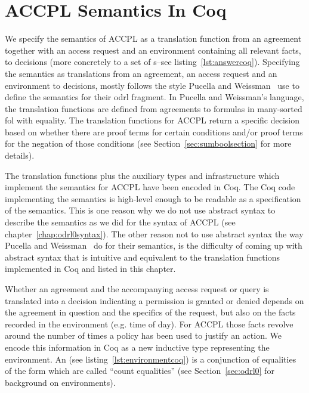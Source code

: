 \chapter{ACCPL Semantics In Coq}\label{chap:accplsemanticscoq}

We specify the semantics of \ac{ACCPL} as a translation function from an agreement together with an access request and an environment containing all relevant facts, to decisions (more concretely to a set of s--see listing~\ref{lst:answercoq}). Specifying the semantics as translations from an agreement, an access request and an environment to decisions, mostly follows the style Pucella and Weissman~\cite{pucella2006} use to define the semantics for their \ac{odrl} fragment. In Pucella and Weissman's language, the translation functions are defined from agreements to formulas in many-sorted \ac{fol} with equality. The translation functions for \ac{ACCPL} return a specific decision based on whether there are proof terms for certain conditions and/or proof terms for the negation of those conditions (see Section~\ref{sec:sumboolsection} for more details).
 

The translation functions plus the auxiliary types and infrastructure which implement the semantics for \ac{ACCPL} have been encoded in Coq. The Coq code implementing the semantics is high-level enough to be readable as a specification of the semantics. This is one reason why we do not use abstract syntax to describe the semantics as we did for the syntax of \ac{ACCPL} (see chapter~\ref{chap:odrl0syntax}). The other reason not to use abstract syntax the way Pucella and Weissman~\cite{pucella2006} do for their semantics, is the difficulty of coming up with abstract syntax that is intuitive and equivalent to the translation functions implemented in Coq and listed in this chapter.

Whether an agreement and the accompanying access request or query is translated into a decision indicating a permission is granted or denied depends on the agreement in question and the specifics of the request, but also on the facts recorded in the environment (e.g. time of day). For \ac{ACCPL} those facts revolve around the number of times a policy has been used to justify an action. We encode this information in Coq as a new inductive type representing the environment. An  (see listing~\ref{lst:environmentcoq}) is a conjunction of equalities of the form  which are called ``count equalities'' (see Section~\ref{sec:odrl0} for background on environments).

